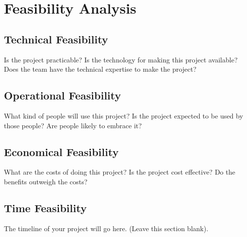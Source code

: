 \section{Feasibility Analysis}




\subsection{Technical Feasibility}
Is the project practicable? Is the technology for making this project available? Does the team have the technical expertise to make the project? 

\subsection{Operational Feasibility}
What kind of people will use this project? Is the project expected to be used by those people? Are people likely to embrace it?

\subsection{Economical Feasibility}
What are the costs of doing this project? Is the project cost effective? Do the benefits outweigh the costs?

\subsection{Time Feasibility}
The timeline of your project will go here. (Leave this section blank). 
